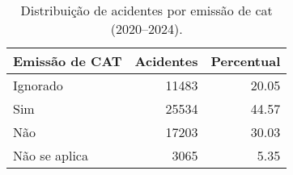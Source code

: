 \begin{table}
\caption{Distribuição de acidentes por emissão de cat (2020–2024).}
\begin{tabular}{lrr}
\toprule
Emissão de CAT & Acidentes & Percentual \\
\midrule
Ignorado & 11483 & 20.05 \\
Sim & 25534 & 44.57 \\
Não & 17203 & 30.03 \\
Não se aplica & 3065 & 5.35 \\
\bottomrule
\end{tabular}
\end{table}
